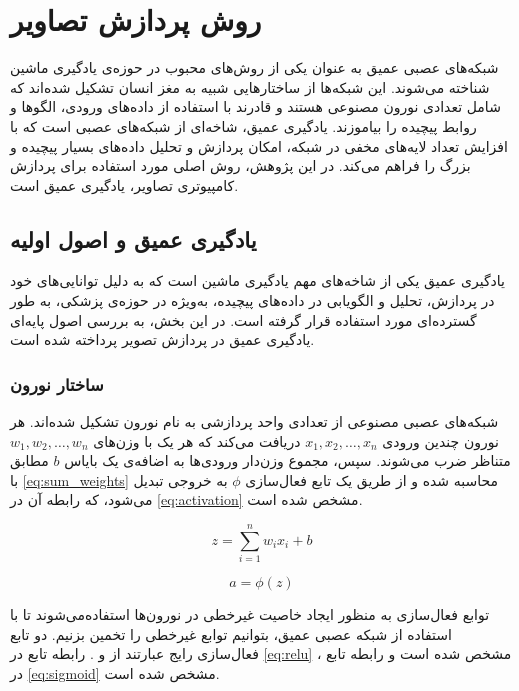 \section{روش پردازش تصاویر}
شبکه‌های عصبی عمیق به عنوان یکی از روش‌های محبوب در حوزه‌ی یادگیری ماشین شناخته می‌شوند. این شبکه‌ها از ساختارهایی شبیه به مغز انسان تشکیل شده‌اند که شامل تعدادی نورون  مصنوعی هستند و قادرند با استفاده از داده‌های ورودی، الگوها و روابط پیچیده را بیاموزند. یادگیری عمیق، شاخه‌ای از شبکه‌های عصبی است که با افزایش تعداد لایه‌های مخفی در شبکه، امکان پردازش و تحلیل داده‌های بسیار پیچیده و بزرگ را فراهم می‌کند.
در این پژوهش، روش اصلی مورد استفاده برای پردازش کامپیوتری تصاویر، یادگیری عمیق است.
\subsection{یادگیری عمیق و اصول اولیه}
یادگیری عمیق یکی از شاخه‌های مهم یادگیری ماشین است که به دلیل توانایی‌های خود در پردازش، تحلیل و الگویابی در داده‌های پیچیده، به‌ویژه در حوزه‌ی پزشکی، به طور گسترده‌ای مورد استفاده قرار گرفته است. در این بخش، به بررسی اصول پایه‌ای یادگیری عمیق در پردازش تصویر پرداخته شده است.

\subsubsection{ساختار نورون}
شبکه‌های عصبی مصنوعی از تعدادی واحد پردازشی به نام نورون تشکیل شده‌اند. هر نورون چندین ورودی \(x_1, x_2, \ldots, x_n\) دریافت می‌کند که هر یک با وزن‌های \(w_1, w_2, \ldots, w_n\) متناظر ضرب می‌شوند. سپس، مجموع وزن‌دار ورودی‌ها به اضافه‌ی یک بایاس \(b\) مطابق با \autoref{eq:sum_weights} محاسبه شده و از طریق یک تابع فعال‌سازی \(\phi\) به خروجی تبدیل می‌شود، که رابطه آن در \autoref{eq:activation} مشخص شده است.

\begin{latin}
\begin{equation}
\label{eq:sum_weights}
z = \sum_{i=1}^{n} w_i x_i + b
\end{equation}
\end{latin}

\begin{latin}
\begin{equation}
\label{eq:activation}
a = \phi(z)
\end{equation}
\end{latin}

توابع فعال‌سازی به منظور ایجاد خاصیت غیرخطی در نورون‌ها استفاده‌می‌شوند تا با استفاده از شبکه عصبی عمیق،‌ بتوانیم توابع غیرخطی را تخمین بزنیم. دو تابع فعال‌سازی رایج عبارتند از
  و
 .
  رابطه تابع
    در
     \autoref{eq:relu}
      مشخص شده است و رابطه تابع 
      ، 
      در
      \autoref{eq:sigmoid}
      مشخص شده است.

